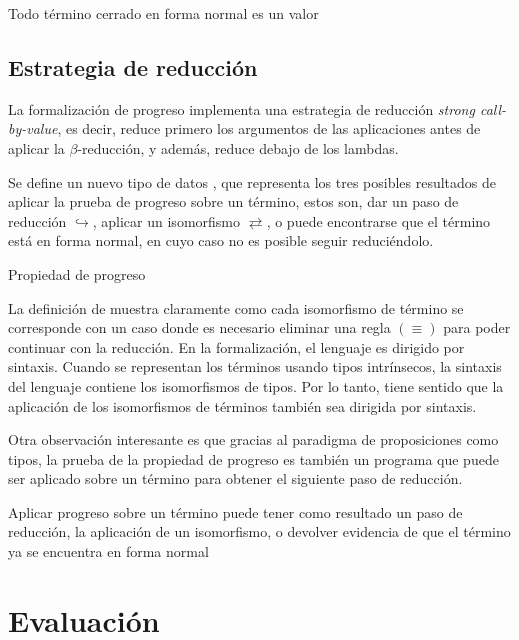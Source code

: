 \begin{codigo}
	Todo término cerrado en forma normal es un valor
\end{codigo}

\subsection{Estrategia de reducción}

La formalización de progreso implementa una estrategia de reducción \textit{strong call-by-value}, es decir, reduce primero los argumentos de las aplicaciones antes de aplicar la $\beta$-reducción, y además, reduce debajo de los lambdas.

Se define un nuevo tipo de datos , que representa los tres posibles resultados de aplicar la prueba de progreso sobre un término, estos son, dar un paso de reducción $\hookrightarrow$, aplicar un isomorfismo $\rightleftarrows$, o puede encontrarse que el término está en forma normal, en cuyo caso no es posible seguir reduciéndolo.

\begin{codigo}
	Propiedad de progreso
\end{codigo}

La definición de  muestra claramente como cada isomorfismo de término se corresponde con un caso donde es necesario eliminar una regla $(\equiv)$ para poder continuar con la reducción.
En la formalización, el lenguaje es dirigido por sintaxis.
Cuando se representan los términos usando tipos intrínsecos, la sintaxis del lenguaje contiene los isomorfismos de tipos.
Por lo tanto, tiene sentido que la aplicación de los isomorfismos de términos también sea dirigida por sintaxis.

Otra observación interesante es que gracias al paradigma de proposiciones como tipos, la prueba de la propiedad de progreso es también un programa que puede ser aplicado sobre un término para obtener el siguiente paso de reducción.

\begin{example}
	Aplicar progreso sobre un término puede tener como resultado un paso de reducción, la aplicación de un isomorfismo, o devolver evidencia de que el término ya se encuentra en forma normal
\end{example}

\section{Evaluación}

